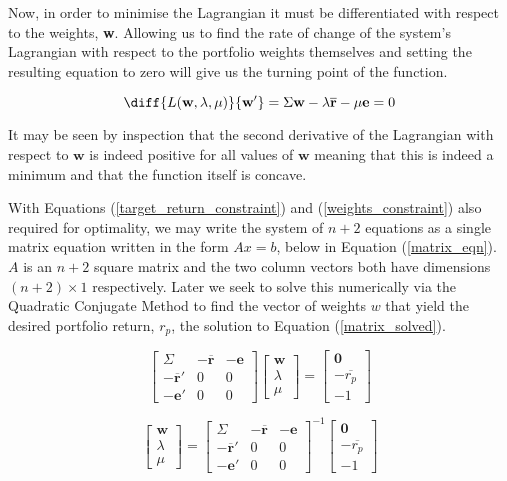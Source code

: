 \documentclass{article}
\begin{document}
Now, in order to minimise the Lagrangian it must be differentiated with respect to the weights, {\textbf{w}}. Allowing us to find the rate of change of the system's Lagrangian with respect to the portfolio weights themselves and setting the resulting equation to zero will give us the turning point of the function.

\begin{equation}
\diff{L(\textbf{w}, \lambda, \mu)}{\textbf{w}'} =  \Sigma\textbf{w}
-\lambda \overline{\textbf{r}}
-\mu\textbf{e} = 0
\label{optimality_lagrangian}
\end{equation}

It may be seen by inspection that the second derivative of the Lagrangian with respect to $\textbf{w}$  is indeed positive for all values of $\textbf{w}$ meaning that this is indeed a minimum and that the function itself is concave.

With Equations (\ref{target_return_constraint}) and (\ref{weights_constraint}) also required for optimality, we may write the system of $n+2$ equations as a single matrix equation written in the form $Ax = b$, below in Equation (\ref{matrix_eqn}). $A$ is an $n+2$ square matrix and the two column vectors both have dimensions $(n+2) \times 1$ respectively. Later we seek to solve this numerically via the Quadratic Conjugate Method to find the vector of weights $w$ that yield the desired portfolio return, $r_p$, the solution to Equation (\ref{matrix_solved}).

\begin{equation}
\begin{bmatrix}
\Sigma & -\overline{\textbf{r}} & -\textbf{e} \\
-\overline{\textbf{r}}'  & 0 & 0 \\
-\textbf{e}' & 0 & 0 
\end{bmatrix}
\begin{bmatrix}
\textbf{w}\\
\lambda \\
\mu
\end{bmatrix}
=
\begin{bmatrix}
\textbf{0}\\
-\overline{r_p}\\
-1
\end{bmatrix}
\label{matrix_eqn}
\end{equation}


\begin{equation}
\begin{bmatrix}
\textbf{w}\\
\lambda \\
\mu
\end{bmatrix}
=
\begin{bmatrix}
\Sigma & -\overline{\textbf{r}} & -\textbf{e} \\
-\overline{\textbf{r}}'  & 0 & 0 \\
-\textbf{e}' & 0 & 0 
\end{bmatrix}^{-1}
\begin{bmatrix}
\textbf{0}\\
-\overline{r_p}\\
-1
\end{bmatrix}
\label{matrix_solved}
\end{equation}
\end{document}
